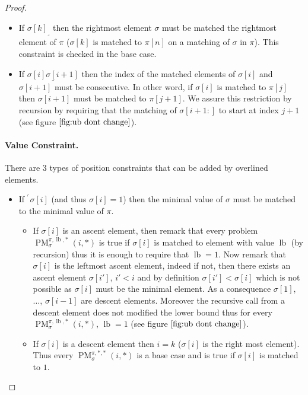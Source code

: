 \documentclass[a4paper]{llncs}
\newcommand{\ptext}{\pi}
\newcommand{\ppattern}{\sigma}
\DeclareMathOperator{\PMa}{PM}
\newcommand{\PM}[6]{\PMa_{{#1}}^{{#2},{#3},{#4}}({#5},{#6})}
\DeclareMathOperator{\lb}{lb}
\begin{document}
\begin{proof}
\begin{itemize}
	\item If ${\ppattern[k]}_\lrcorner$ then the rightmost element $\sigma$ must be matched the rightmost element of $\pi$ ($\ppattern[k]$ is matched to $\ptext[n]$ on a matching of $\ppattern$ in $\ptext$). This constraint is checked in the base case.

	\item If $\underline{\ppattern[i]\ppattern[i+1]}$ then the index of the matched elements of $\ppattern[i]$ and $\ppattern[i+1]$ must be consecutive. In other word, if $\ppattern[i]$ is matched to $\ptext[j]$ then $\ppattern[i+1]$ must be matched to $\ptext[j+1]$. We assure this restriction by recursion by requiring that the matching of $\ppattern[i+1:]$ to start at index $j+1$ (see figure $\ref{fig:ub dont change}$).
\end{itemize}

\paragraph{Value Constraint.} There are 3 types of position constraints that can be added by overlined elements.
\begin{itemize}
	\item If $^\ulcorner{\sigma[i]}$ (and thus $\sigma[i]=1$) then the minimal value of $\ppattern$ must be matched to the minimal value of $\ptext$.
	\begin{itemize}

		\item If $\sigma[i]$ is an ascent element, then remark that 
		every problem 
		$\PM{\sigma}{\ptext}{\lb}{*}{i}{*}$ is true if $\sigma[i]$ is matched to element with value $\lb$ (by recursion) thus it is enough to require that $\lb=1$.
		Now remark that $\sigma[i]$ is the leftmost ascent element, indeed if not, then there exists an ascent element $\sigma[i']$, $i'<i$ and by definition $\sigma[i']<\sigma[i]$ which is not possible as $\sigma[i]$ must be the minimal element. 
		As a consequence $\sigma[1]$, $\ldots$, $\sigma[i-1]$ are descent elements.
		Moreover the recursive call from a descent element does not modified the lower bound
		thus for every $\PM{\sigma}{\ptext}{\lb}{*}{i}{*}$, $\lb=1$ (see figure $\ref{fig:ub dont change}$). 			

		\item If $\sigma[i]$ is a descent element then $i=k$ ($\sigma[i]$ is the right most element). Thus every $\PM{\sigma}{\ptext}{*}{*}{i}{*}$ is a base case and is true if $\sigma[i]$ is matched to $1$.


\end{itemize}
\end{itemize}
\end{proof}
\end{document}
